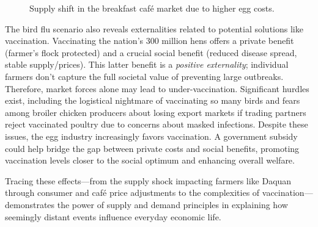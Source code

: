 \documentclass[12pt]{article}
\begin{document}
\begin{doublespace}
\begin{figure}[H]
\caption{Supply shift in the breakfast caf\'{e} market due to higher egg costs.}
\label{fig:cafe_market}
\end{figure}

The bird flu scenario also reveals externalities related to potential solutions like vaccination. Vaccinating the nation's 300 million hens offers a private benefit (farmer's flock protected) and a crucial social benefit (reduced disease spread, stable supply/prices). This latter benefit is a \emph{positive externality}; individual farmers don't capture the full societal value of preventing large outbreaks. Therefore, market forces alone may lead to under-vaccination. Significant hurdles exist, including the logistical nightmare of vaccinating so many birds and fears among broiler chicken producers about losing export markets if trading partners reject vaccinated poultry due to concerns about masked infections. Despite these issues, the egg industry increasingly favors vaccination. A government subsidy could help bridge the gap between private costs and social benefits, promoting vaccination levels closer to the social optimum and enhancing overall welfare.

Tracing these effects—from the supply shock impacting farmers like Daquan through consumer and café price adjustments to the complexities of vaccination—demonstrates the power of supply and demand principles in explaining how seemingly distant events influence everyday economic life.

\end{doublespace}
\end{document}
